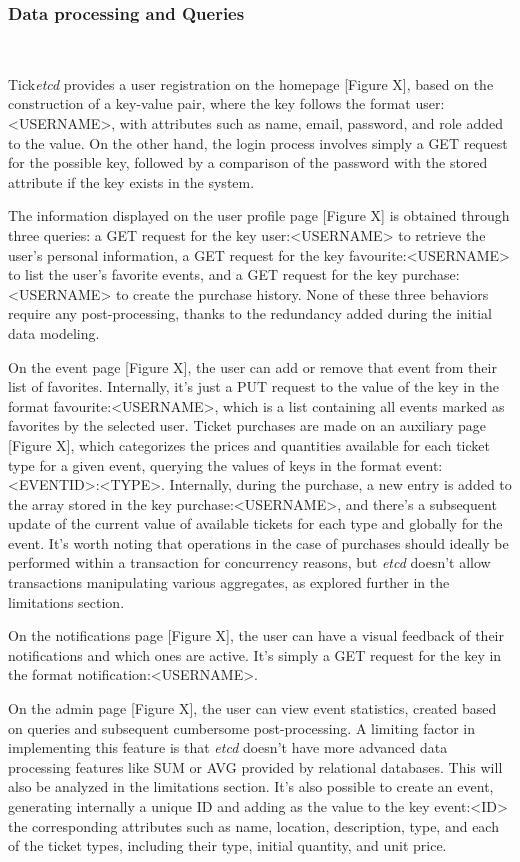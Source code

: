 \documentclass[screen,review]{acmart}
\begin{document}
\subsubsection{Data processing and Queries}~\

Tick\textit{etcd} provides a user registration on the homepage [Figure X], based on the construction of a key-value pair, where the key follows the format user:<USERNAME>, with attributes such as name, email, password, and role added to the value. On the other hand, the login process involves simply a GET request for the possible key, followed by a comparison of the password with the stored attribute if the key exists in the system.

The information displayed on the user profile page [Figure X] is obtained through three queries: a GET request for the key user:<USERNAME> to retrieve the user's personal information, a GET request for the key favourite:<USERNAME> to list the user's favorite events, and a GET request for the key purchase:<USERNAME> to create the purchase history. None of these three behaviors require any post-processing, thanks to the redundancy added during the initial data modeling.

On the event page [Figure X], the user can add or remove that event from their list of favorites. Internally, it's just a PUT request to the value of the key in the format favourite:<USERNAME>, which is a list containing all events marked as favorites by the selected user. Ticket purchases are made on an auxiliary page [Figure X], which categorizes the prices and quantities available for each ticket type for a given event, querying the values of keys in the format event:<EVENTID>:<TYPE>. Internally, during the purchase, a new entry is added to the array stored in the key purchase:<USERNAME>, and there's a subsequent update of the current value of available tickets for each type and globally for the event. It's worth noting that operations in the case of purchases should ideally be performed within a transaction for concurrency reasons, but \textit{etcd} doesn't allow transactions manipulating various aggregates, as explored further in the limitations section.

On the notifications page [Figure X], the user can have a visual feedback of their notifications and which ones are active. It's simply a GET request for the key in the format notification:<USERNAME>.

On the admin page [Figure X], the user can view event statistics, created based on queries and subsequent cumbersome post-processing. A limiting factor in implementing this feature is that \textit{etcd} doesn't have more advanced data processing features like SUM or AVG provided by relational databases. This will also be analyzed in the limitations section. It's also possible to create an event, generating internally a unique ID and adding as the value to the key event:<ID> the corresponding attributes such as name, location, description, type, and each of the ticket types, including their type, initial quantity, and unit price. \\
\end{document}
